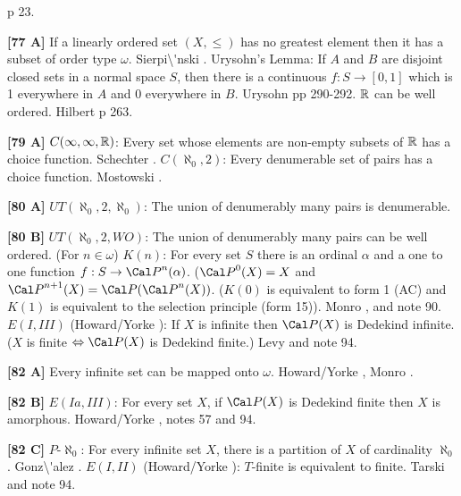 \cite{1973b} p 23.
\smallskip
\item{}{\bf [77 A]}  If a linearly ordered set $(X,\le)$ has  no
greatest element then it has a subset of order type $\omega$.
\ac{Sierpi\'nski} \cite{1918}.
\medskip
{} Urysohn's Lemma:  If $A$ and $B$ are disjoint closed
sets in a normal space $S$, then there is a continuous $f:S\rightarrow
[0,1]$ which is 1 everywhere in $A$ and 0 everywhere in $B$.
\ac{Urysohn} \cite{1925} pp 290-292.  
\medskip
{} ${\Bbb R}$ can be well ordered.  \ac{Hilbert}
\cite{1900} p 263.
\smallskip
\item{}{\bf [79 A]}  $C(\infty,\infty,{\Bbb R})$:  Every set  whose
elements  are non-empty subsets of ${\Bbb R}$ has a choice function.
\ac{Schechter} \cite{1996a}.
\medskip
{} $C(\aleph_{0},2)$:  Every denumerable set of  pairs
has  a  choice function.  \ac{Mostowski} \cite{1948}.
\smallskip
\item{}{\bf [80 A]} $UT(\aleph_0,2,\aleph_0)$: The union of denumerably
many pairs is denumerable.
\smallskip
\item{}{\bf [80 B]} $UT(\aleph_0,2, WO)$: The union of denumerably
many pairs can be well ordered.
\medskip
{} (For $n\in\omega$) $K(n)$: For every
set $S$ there is an ordinal $\alpha$ and a one to one function
$f: S \rightarrow {\Cal P}^{n}(\alpha)$. (${\Cal P}^{0}(X) = X$
and ${\Cal P}^{n+1}(X) = {\Cal P}({\Cal P}^{n}(X))$. ($K(0)$ is
equivalent to form 1 (AC)  and $K(1)$ is equivalent to the selection
principle (form 15)). \ac{Monro} \cite{1972}, \cite{1973b} and note 90.
\medskip
{} $E(I,III)$ (\ac{Howard/Yorke} \cite{1989}): If $X$
is infinite then $\Cal P(X)$ is Dedekind infinite. ($X$ is finite
$\Leftrightarrow {\Cal P}(X)$ is Dedekind finite.) \ac{Levy} \cite{1958}
and note 94.
\smallskip
\item{}{\bf [82 A]} Every infinite set can be mapped onto $\omega$.
\ac{Howard/Yorke} \cite{1989}, \ac{Monro} \cite{1972}.
\smallskip
\item{}{\bf [82 B]} $E(Ia,III)$: For every set $X$, if $\Cal P(X)$ is
Dedekind finite then $X$ is amorphous.  \ac{Howard/Yorke} \cite{1989},
notes 57 and 94.
\smallskip
\item{}{\bf [82 C]} $P$-$\aleph_0$:  For every infinite set
$X$, there is a partition of $X$ of cardinality $\aleph_0$.
\ac{Gonz\'alez} \cite{1995a}.
\medskip
{} $E(I,II)$ (\ac{Howard/Yorke} \cite{1989}):
$T$-finite is equivalent to finite. \ac{Tarski} \cite{1924} and note 94.
